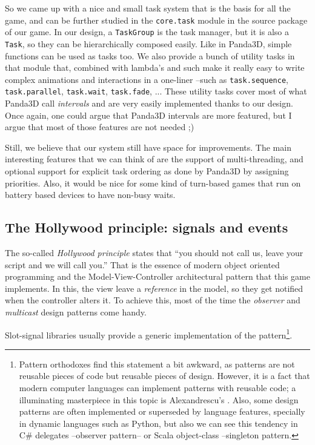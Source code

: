 \documentclass[a4paper,10pt]{article}
\begin{document}
So we came up with a nice and small task system that is the basis
for all the game, and can be further studied in the
\texttt{core.task} module in the source package of our game. In our
design, a \texttt{TaskGroup} is the task manager, but it is also a
\texttt{Task}, so they can be hierarchically composed easily. Like
in Panda3D, simple functions can be used as tasks too. We also
provide a bunch of utility tasks in that module that, combined with
lambda's and such make it really easy to write complex animations
and interactions in a one-liner --such as \texttt{task.sequence},
\texttt{task.parallel}, \texttt{task.wait}, \texttt{task.fade},
... These utility tasks cover most of what Panda3D call
\emph{intervals} and are very easily implemented thanks to our
design. Once again, one could argue that Panda3D intervals are more
featured, but I argue that most of those features are not needed ;)

Still, we believe that our system still have space for
improvements. The main interesting features that we can think of are
the support of multi-threading, and optional support for explicit task
ordering as done by Panda3D by assigning priorities. Also, it would be
nice for some kind of turn-based games that run on battery based
devices to have non-busy waits.

\subsection{The Hollywood principle: signals and events}
\label{sec:hollywood}
The so-called \emph{Hollywood principle} states that ``you should not
call us, leave your script and we will call you.'' That is the essence
of modern object oriented programming and the Model-View-Controller
architectural pattern that this game implements. In this, the view
leave a \emph{reference} in the model, so they get notified when the
controller alters it. To achieve this, most of the time the
\emph{observer}\cite{gamma95design} and \emph{multicast}\cite{vlissides98pattern} design
patterns come handy.

Slot-signal libraries usually provide a generic implementation of the
pattern\footnote{Pattern orthodoxes find this statement a bit awkward,
as patterns are not reusable pieces of code but reusable pieces of
design. However, it is a fact that modern computer languages can
implement patterns with reusable code; a illuminating masterpiece in
this topic is Alexandrescu's \cite{alexandrescu01modern}. Also, some design
patterns are often implemented or superseded by language features,
specially in dynamic languages such as Python, but also we can see
this tendency in C\# delegates --observer pattern-- or Scala
object-class --singleton pattern.}.
\end{document}
